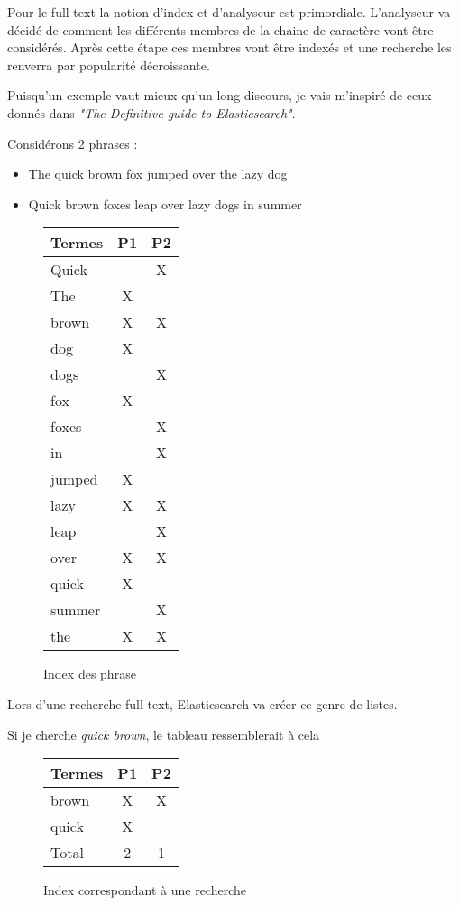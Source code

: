 Pour le full text la notion d'index et d'analyseur est primordiale. L'analyseur va
décidé de comment les différents membres de la chaine de caractère vont être considérés.
Après cette étape ces membres vont être indexés et une recherche les renverra par 
popularité décroissante.

Puisqu'un exemple vaut mieux qu'un long discours, je vais m'inspiré de ceux donnés
dans \textit{"The Definitive guide to Elasticsearch"}.


Considérons 2 phrases :
\begin{itemize}
    \item The quick brown fox jumped over the lazy dog
    \item Quick brown foxes leap over lazy dogs in summer
\end{itemize}

\begin{figure}[H]
\center
\begin{tabular}{|l||c|c|}
\hline
\textbf{Termes}   & \textbf{P1}    & \textbf{P2}\\ \hline  
Quick   &       &  X\\ \hline  
The     &   X   &   \\ \hline
brown   &   X   &  X\\ \hline
dog     &   X   &   \\ \hline
dogs    &       &  X\\ \hline
fox     &   X   &   \\ \hline
foxes   &       &  X\\ \hline
in      &       &  X\\ \hline
jumped  &   X   &   \\ \hline
lazy    &   X   &  X\\ \hline
leap    &       &  X\\ \hline
over    &   X   &  X\\ \hline
quick   &   X   &   \\ \hline
summer  &       &  X\\ \hline
the     &   X   &  X\\ \hline 
\end{tabular}
\caption{Index des phrase}
\end{figure}
Lors d'une recherche full text, Elasticsearch va créer ce genre de listes.

Si je cherche \emph{quick brown}, le tableau ressemblerait à cela 


\begin{figure}[H]
\center
\begin{tabular}{|l||c|c|}
\hline
\textbf{Termes}   & \textbf{P1}    & \textbf{P2}\\ \hline  
brown   &   X   &  X\\ \hline
quick   &   X   &   \\ \hline \hline
Total   &   2   &  1 \\ \hline
\end{tabular}
\caption{Index correspondant à une recherche}
\end{figure}

